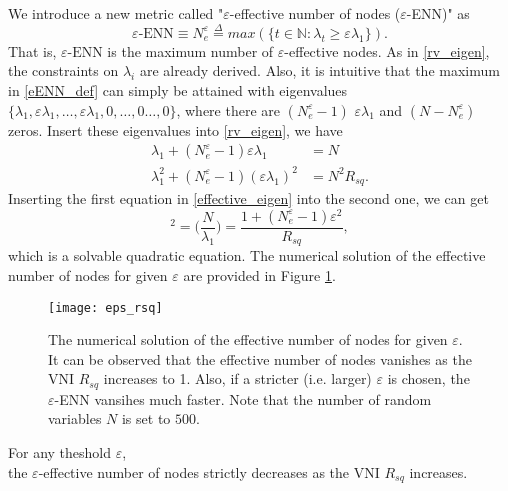 We introduce a new metric called "$\varepsilon$-effective number of nodes ($\varepsilon$-ENN)" as
\begin{equation}
    \varepsilon\text{-ENN}
    \equiv N_{e}^\varepsilon
    \overset{\Delta}{=}max(\{t\in\mathbb{N}: \lambda_t\geq\varepsilon\lambda_1\}).
    \label{eENN_def}
\end{equation}
That is, $\varepsilon\text{-ENN}$ is the maximum number of $\varepsilon$-effective nodes.
As in \eqref{rv_eigen}, the constraints on $\lambda_i$ are already derived.
Also, it is intuitive that the maximum in \eqref{eENN_def} can simply be attained with eigenvalues
$\{\lambda_1, \varepsilon\lambda_1, \dots, \varepsilon\lambda_1, 0, \dots, 0\dots, 0\}$, where there are 
$(N_{e}^\varepsilon-1)$ $\varepsilon\lambda_1$ and $(N-N_e^\varepsilon)$ zeros.
Insert these eigenvalues into \eqref{rv_eigen}, we have
\begin{equation}
    \begin{aligned}
        \lambda_1+(N_e^\varepsilon-1)\varepsilon\lambda_1 &= N \\
        \lambda_1^2+(N_e^\varepsilon-1)(\varepsilon\lambda_1)^2 &= N^2R_{sq}.
    \end{aligned}
    \label{effective_eigen}
\end{equation}
Inserting the first equation in \eqref{effective_eigen} into the second one, we can get
\begin{equation}
    [1+(N_e^\varepsilon-1)\varepsilon]^2
    =\Big(\frac{N}{\lambda_1}\Big)
    =\frac{1+(N_e^\varepsilon-1)\varepsilon^2}{R_{sq}},
    \label{quad_eenn}
\end{equation}
which is a solvable quadratic equation. The numerical solution of the effective number of nodes for
given $\varepsilon$ are provided in Figure \ref{fig:eps_rsq}.

\begin{figure}[h]
    \centering
    \texttt{[image: eps\_rsq]}
    \caption[The effective number of nodes to the VNI $R_{sq}$]
    {The numerical solution of the effective number of nodes for given $\varepsilon$.
    It can be observed that the effective number of nodes vanishes as the VNI $R_{sq}$ increases to 1.
    Also, if a stricter (i.e. larger) $\varepsilon$ is chosen, the $\varepsilon$-ENN vansihes much
    faster.
    Note that the number of random variables $N$ is set to $500$.
    }
    \label{fig:eps_rsq}
\end{figure}

\begin{theorem}
    \label{oppo}
    For any theshold $\varepsilon$, 
    \\the $\varepsilon$-effective number of nodes strictly decreases as the VNI $R_{sq}$ increases.
\end{theorem}

